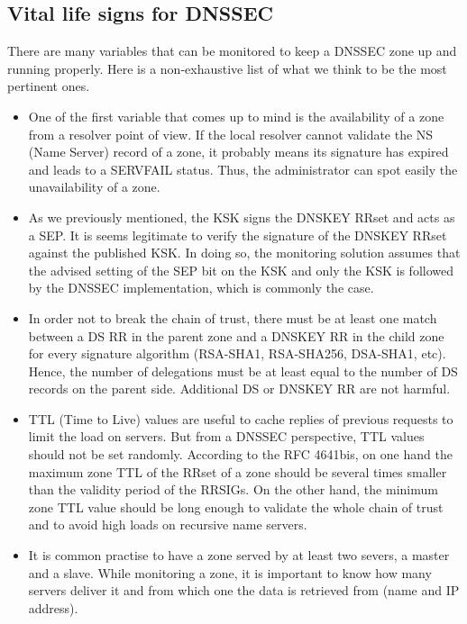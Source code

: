 \subsection{Vital life signs for DNSSEC}
\label{section:vital-life-signs-dnssec}
There are many variables that can be monitored to keep a DNSSEC zone up and running properly. Here is a non-exhaustive list of what we think to be the most pertinent ones.


\begin{itemize}
\item One of the first variable that comes up to mind is the availability of a zone from a resolver point of view. If the local resolver cannot validate the NS (Name Server) record of a zone, it probably means its signature has expired and leads to a SERVFAIL status. Thus, the administrator can spot easily the unavailability of a zone.

\item As we previously mentioned, the KSK signs the DNSKEY RRset and acts as a SEP. It is seems legitimate to verify the signature of the DNSKEY RRset against the published KSK. In doing so, the monitoring solution assumes that the advised setting of the SEP bit on the KSK and only the KSK is followed by the DNSSEC implementation, which is commonly the case.

\item In order not to break the chain of trust, there must be at least one match between a DS RR in the parent zone and a DNSKEY RR in the child zone for every signature algorithm (RSA-SHA1, RSA-SHA256, DSA-SHA1, etc). Hence, the number of delegations must be at least equal to the number of DS records on the parent side. Additional DS or DNSKEY RR are not harmful.

\item TTL (Time to Live) values are useful to cache replies of previous requests to limit the load on servers. But from a DNSSEC perspective, TTL values should not be set randomly. According to the RFC 4641bis, on one hand the maximum zone TTL of the RRset of a zone should be several times smaller than the validity period of the RRSIGs. On the other hand, the minimum zone TTL value should be long enough to validate the whole chain of trust and to avoid high loads on recursive name servers.

\item It is common practise to have a zone served by at least two severs, a master and a slave. While monitoring a zone, it is important to know how many servers deliver it and from which one the data is retrieved from (name and IP address).


\end{itemize}
